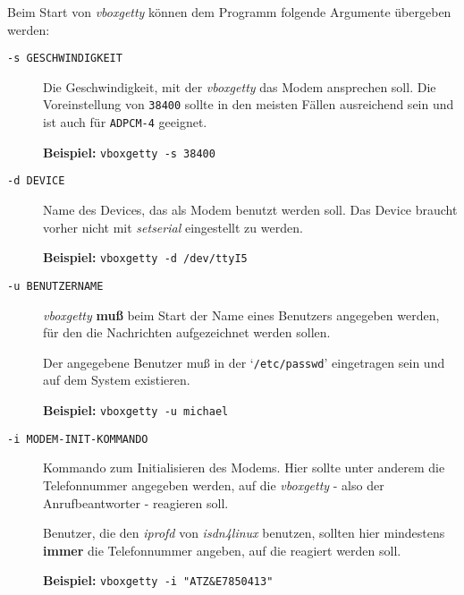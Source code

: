 Beim Start von {\em vboxgetty\/} k\"{o}nnen dem Programm folgende Argumente
\"{u}bergeben werden:

\begin{description}


\item[{\tt -s GESCHWINDIGKEIT}] \mbox{}



Die Geschwindigkeit, mit der {\em vboxgetty\/} das Modem ansprechen
soll. Die Voreinstellung von {\tt 38400} sollte in den meisten F\"{a}llen
ausreichend sein und ist auch f\"{u}r {\tt ADPCM-4} geeignet.

{\bf Beispiel:} {\tt vboxgetty -s 38400}



\item[{\tt -d DEVICE}] \mbox{}



Name des Devices, das als Modem benutzt werden soll. Das Device braucht
vorher nicht mit {\em setserial\/} eingestellt zu werden.

{\bf Beispiel:} {\tt vboxgetty -d /dev/ttyI5}



\item[{\tt -u BENUTZERNAME}] \mbox{}



{\em vboxgetty\/} {\bf mu{\ss}} beim Start der Name eines Benutzers
angegeben werden, f\"{u}r den die Nachrichten aufgezeichnet werden sollen.

Der angegebene Benutzer mu{\ss} in der `{\tt /etc/passwd}' eingetragen
sein und auf dem System existieren.

{\bf Beispiel:} {\tt vboxgetty -u michael}



\item[{\tt -i MODEM-INIT-KOMMANDO}] \mbox{}



Kommando zum Initialisieren des Modems. Hier sollte unter anderem die
Telefonnummer angegeben werden, auf die {\em vboxgetty\/} - also der
Anrufbeantworter - reagieren soll.

Benutzer, die den {\em iprofd\/} von {\em isdn4linux\/} benutzen,
sollten hier mindestens {\bf immer} die Telefonnummer angeben, auf die
reagiert werden soll.

{\bf Beispiel:} {\tt vboxgetty -i "ATZ\&E7850413"}



\end{description}


